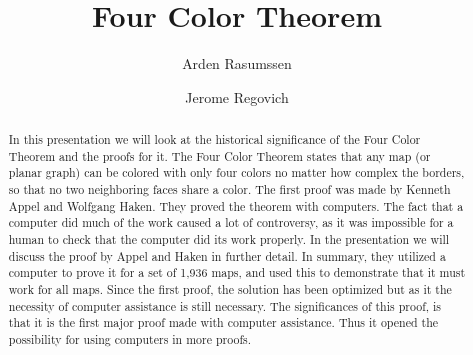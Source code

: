 \documentclass[10pt]{article}
\title{Four Color Theorem}
\author{Arden Rasumssen \and Jerome Regovich}
\begin{document}
\maketitle
\begin{abstract}


  In this presentation we will look at the historical significance of the Four
  Color Theorem and the proofs for it. The Four Color Theorem states that any
  map (or planar graph) can be colored with only four colors no matter how
  complex the borders, so that no two neighboring faces share a color. The
  first proof was made by Kenneth Appel and Wolfgang Haken. They proved the
  theorem with computers. The fact that a computer did much of the work caused
  a lot of controversy, as it was impossible for a human to check that the
  computer did its work properly. In the presentation we will discuss the proof
  by Appel and Haken in further detail. In summary, they utilized a computer to
  prove it for a set of 1,936 maps, and used this to demonstrate that it must
  work for all maps. Since the first proof, the solution has been optimized but
  as it the necessity of computer assistance is still necessary. The
  significances of this proof, is that it is the first major proof made with
  computer assistance. Thus it opened the possibility for using computers in
  more proofs.

\end{abstract}
\nocite{*}
\printbibliography{}
\end{document}

